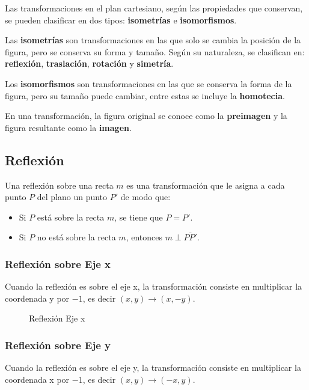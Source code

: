 Las transformaciones en el plan cartesiano, según las propiedades que conservan, se pueden clasificar en dos tipos: \textbf{isometrías} e \textbf{isomorfismos}.

Las \textbf{isometrías} son transformaciones en las que solo se cambia la posición de la figura, pero se conserva su forma y tamaño. Según su naturaleza, se clasifican en: \textbf{reflexión}, \textbf{traslación}, \textbf{rotación} y \textbf{simetría}.

Los \textbf{isomorfismos} son transformaciones en las que se conserva la forma de la figura, pero su tamaño puede cambiar, entre estas se incluye la \textbf{homotecia}.

En una transformación, la figura original se conoce como la \textbf{preimagen} y la figura resultante como la \textbf{imagen}.


\subsection{Reflexión}

Una reflexión sobre una recta $m$ es una transformación que le asigna a cada punto $P$ del plano un punto $P'$ de modo que:

\begin{itemize}
    \item Si $P$ está sobre la recta $m$, se tiene que $P = P'$.
    \item Si $P$ no está sobre la recta $m$, entonces $m \perp \overline{PP'}$.
\end{itemize}

\subsubsection{Reflexión sobre Eje x}

Cuando la reflexión es sobre el eje x, la transformación consiste en multiplicar la coordenada y por $-1$, es decir $(x,y) \to (x,-y)$.

\begin{figure}[h]
    \centering
    
    \caption{Reflexión Eje x}
    \label{fig:reflexion-eje-x}
\end{figure}


\subsubsection{Reflexión sobre Eje y}

Cuando la reflexión es sobre el eje y, la transformación consiste en multiplicar la coordenada x por $-1$, es decir $(x,y) \to (-x,y)$.

